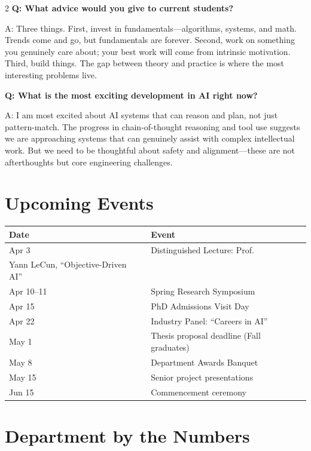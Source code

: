\documentclass[10pt,a4paper]{article}
\begin{document}
\begin{multicols}{2}
\textbf{Q: What advice would you give to current students?}

A: Three things. First, invest in fundamentals---algorithms, systems, and math. Trends come and go, but fundamentals are forever. Second, work on something you genuinely care about; your best work will come from intrinsic motivation. Third, build things. The gap between theory and practice is where the most interesting problems live.

\textbf{Q: What is the most exciting development in AI right now?}

A: I am most excited about AI systems that can reason and plan, not just pattern-match. The progress in chain-of-thought reasoning and tool use suggests we are approaching systems that can genuinely assist with complex intellectual work. But we need to be thoughtful about safety and alignment---these are not afterthoughts but core engineering challenges.

\section{Upcoming Events}

\renewcommand{\arraystretch}{1.3}
\begin{tabularx}{\columnwidth}{@{}lX@{}}
\toprule
\textbf{Date} & \textbf{Event} \\
\midrule
Apr 3 & Distinguished Lecture: Prof.\\ Yann LeCun, ``Objective-Driven AI'' \\
Apr 10--11 & Spring Research Symposium \\
Apr 15 & PhD Admissions Visit Day \\
Apr 22 & Industry Panel: ``Careers in AI'' \\
May 1 & Thesis proposal deadline (Fall graduates) \\
May 8 & Department Awards Banquet \\
May 15 & Senior project presentations \\
Jun 15 & Commencement ceremony \\
\bottomrule
\end{tabularx}

\section{Department by the Numbers}


\end{multicols}
\end{document}
